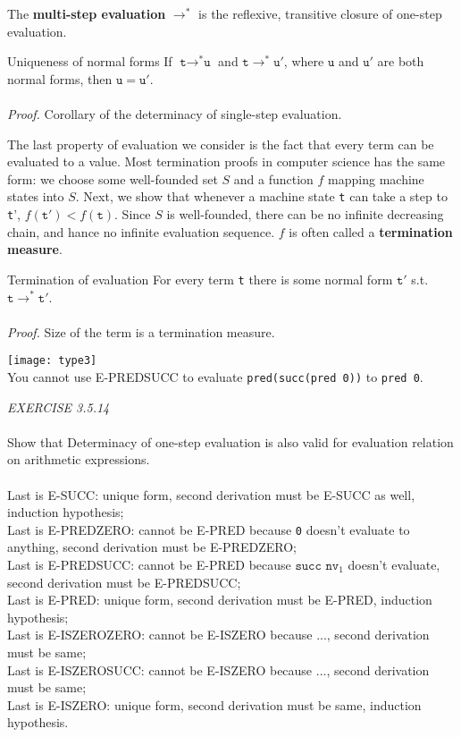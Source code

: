 \documentclass{article}
\begin{document}
The \textbf{multi-step evaluation} \(\to^{*}\) is the reflexive, transitive closure of one-step evaluation.\\
\begin{redrules}\color{red}
Uniqueness of normal forms \color{black} If \(\texttt{t}\to^{*}\texttt{u}\) and \(\texttt{t}\to^{*}\texttt{u}'\), where \(\texttt{u}\) and \(\texttt{u}'\) are both normal forms, then \(\texttt{u}=\texttt{u}'\).\\\\
\textit{Proof.} Corollary of the determinacy of single-step evaluation.
\end{redrules}
The last property of evaluation we consider is the fact that every term can be evaluated to a value. Most termination proofs in computer science has the same form: we choose some well-founded set \(S\) and a function \(f\) mapping machine states into \(S\).
Next, we show that whenever a machine state \texttt{t} can take a step to \texttt{t}', \(f(\texttt{t}')<f(\texttt{t})\). Since \(S\) is well-founded, there can be no infinite decreasing chain, and hance no infinite evaluation sequence. \(f\) is often called a \textbf{termination measure}.\\
\begin{redrules}\color{red}
Termination of evaluation \color{black} For every term \texttt{t} there is some normal form \(\texttt{t}'\) s.t. \(\texttt{t}\to^{*}\texttt{t}'\).\\\\
\textit{Proof.} Size of the term is a termination measure.
\end{redrules}
\texttt{[image: type3]}\\
You cannot use E-PREDSUCC to evaluate \texttt{pred(succ(pred 0))} to \texttt{pred 0}.
\begin{siderules}\color{blue}\textit{EXERCISE 3.5.14}\color{black}\\\\
    \color{blue}Show that Determinacy of one-step evaluation is also valid for evaluation relation on arithmetic expressions.\\\\\color{black}
    Last is E-SUCC: unique form, second derivation must be E-SUCC as well, induction hypothesis;\\
    Last is E-PREDZERO: cannot be E-PRED because \texttt{0} doesn't evaluate to anything, second derivation must be E-PREDZERO;\\
    Last is E-PREDSUCC: cannot be E-PRED because \(\texttt{succ nv}_{1}\) doesn't evaluate, second derivation must be E-PREDSUCC;\\
    Last is E-PRED: unique form, second derivation must be E-PRED, induction hypothesis;\\
    Last is E-ISZEROZERO: cannot be E-ISZERO because ..., second derivation must be same;\\
    Last is E-ISZEROSUCC: cannot be E-ISZERO because ..., second derivation must be same;\\
    Last is E-ISZERO: unique form, second derivation must be same, induction hypothesis.
\end{siderules}
\end{document}
